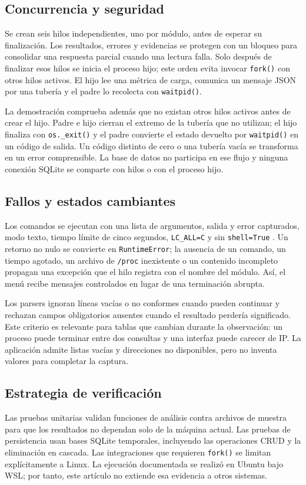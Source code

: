 \documentclass[conference]{IEEEtran}
\begin{document}
\subsection{Concurrencia y seguridad}
Se crean seis hilos independientes, uno por m\'odulo, antes de esperar su finalizaci\'on. Los resultados, errores y evidencias se protegen con un bloqueo para consolidar una respuesta parcial cuando una lectura falla. Solo despu\'es de finalizar esos hilos se inicia el proceso hijo; este orden evita invocar \texttt{fork()} con otros hilos activos. El hijo lee una m\'etrica de carga, comunica un mensaje JSON por una tuber\'ia y el padre lo recolecta con \texttt{waitpid()}.

La demostraci\'on comprueba adem\'as que no existan otros hilos activos antes de crear el hijo. Padre e hijo cierran el extremo de la tuber\'ia que no utilizan; el hijo finaliza con \texttt{os.\_exit()} y el padre convierte el estado devuelto por \texttt{waitpid()} en un c\'odigo de salida. Un c\'odigo distinto de cero o una tuber\'ia vac\'ia se transforma en un error comprensible. La base de datos no participa en ese flujo y ninguna conexi\'on SQLite se comparte con hilos o con el proceso hijo.

\subsection{Fallos y estados cambiantes}
Los comandos se ejecutan con una lista de argumentos, salida y error capturados, modo texto, tiempo l\'imite de cinco segundos, \texttt{LC\_ALL=C} y sin \texttt{shell=True} \cite{pythonsubprocess}. Un retorno no nulo se convierte en \texttt{RuntimeError}; la ausencia de un comando, un tiempo agotado, un archivo de \texttt{/proc} inexistente o un contenido incompleto propagan una excepci\'on que el hilo registra con el nombre del m\'odulo. As\'i, el men\'u recibe mensajes controlados en lugar de una terminaci\'on abrupta.

Los parsers ignoran l\'ineas vac\'ias o no conformes cuando pueden continuar y rechazan campos obligatorios ausentes cuando el resultado perder\'ia significado. Este criterio es relevante para tablas que cambian durante la observaci\'on: un proceso puede terminar entre dos consultas y una interfaz puede carecer de IP. La aplicaci\'on admite listas vac\'ias y direcciones no disponibles, pero no inventa valores para completar la captura.

\subsection{Estrategia de verificaci\'on}
Las pruebas unitarias validan funciones de an\'alisis contra archivos de muestra para que los resultados no dependan solo de la m\'aquina actual. Las pruebas de persistencia usan bases SQLite temporales, incluyendo las operaciones CRUD y la eliminaci\'on en cascada. Las integraciones que requieren \texttt{fork()} se limitan expl\'icitamente a Linux. La ejecuci\'on documentada se realiz\'o en Ubuntu bajo WSL; por tanto, este art\'iculo no extiende esa evidencia a otros sistemas.
\end{document}
